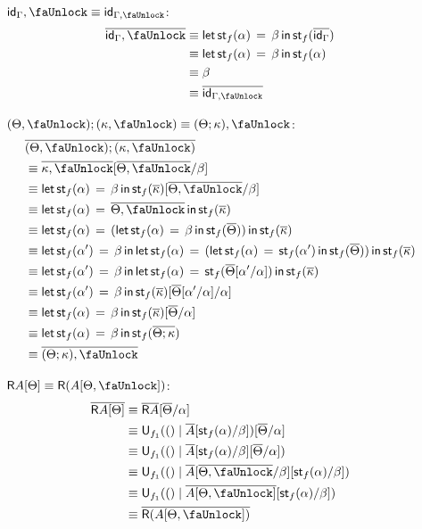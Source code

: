 \documentclass[10pt]{article}
\theoremstyle{definition}
\newcommand{\id}{\mathsf{id}}
\newcommand\U[3]{\ensuremath{\mathsf{U}_{#1}(#2 \mid #3)}}
\newcommand\StI[2]{\ensuremath{\mathsf{st}_{#1}(#2)}}
\newcommand\StE[4]{\ensuremath{\mathsf{let} \, \StI{#1}{#3} \, = \, {#2} \, \mathsf{in} \, #4}}
\newcommand{\upstairs}[1]{\overline{#1}}
\newcommand{\lock}{\text{\faUnlock}}
\newcommand{\Rtype}[1]{\mathsf{R}{#1}}
\begin{document}
\begin{enumerate}[style = multiline, labelwidth = 80pt]
\item[{$\id_\Gamma , \lock \equiv \id_{\Gamma, \lock}$}:]
\begin{align*}
\upstairs{\id_\Gamma , \lock} 
&\equiv \StE{f}{\beta}{\alpha}{\StI{f}{\upstairs{\id_\Gamma}}} \\ 
&\equiv \StE{f}{\beta}{\alpha}{\StI{f}{\alpha}} \\ 
&\equiv \beta \\
&\equiv \upstairs{\id_{\Gamma , \lock}} 
\end{align*}
\item[{$(\Theta, \lock) ; (\kappa, \lock) \equiv (\Theta ; \kappa), \lock$}:] 
\begin{align*}
&\upstairs{(\Theta, \lock) ; (\kappa, \lock)} \\
&\equiv \upstairs{\kappa, \lock}[\upstairs{\Theta, \lock}/\beta] \\
&\equiv \StE{f}{\beta}{\alpha}{\StI{f}{\upstairs{\kappa}}}[\upstairs{\Theta, \lock}/\beta] \\
&\equiv \StE{f}{\upstairs{\Theta, \lock}}{\alpha}{\StI{f}{\upstairs{\kappa}}} \\
&\equiv \StE{f}{(\StE{f}{\beta}{\alpha}{\StI{f}{\upstairs{\Theta}}})}{\alpha}{\StI{f}{\upstairs{\kappa}}} \\
&\equiv \StE{f}{\beta}{\alpha'}{\StE{f}{(\StE{f}{\StI{f}{\alpha'}}{\alpha}{\StI{f}{\upstairs{\Theta}}})}{\alpha}{\StI{f}{\upstairs{\kappa}}}} \\
&\equiv \StE{f}{\beta}{\alpha'}{\StE{f}{\StI{f}{\upstairs{\Theta}[\alpha'/\alpha]}}{\alpha}{\StI{f}{\upstairs{\kappa}}}} \\
&\equiv \StE{f}{\beta}{\alpha'}{\StI{f}{\upstairs{\kappa}}[\upstairs{\Theta}[\alpha'/\alpha]/\alpha]} \\
&\equiv \StE{f}{\beta}{\alpha}{\StI{f}{\upstairs{\kappa}}[\upstairs{\Theta}/\alpha]} \\
&\equiv \StE{f}{\beta}{\alpha}{\StI{f}{\upstairs{\Theta;\kappa}}} \\
&\equiv \upstairs{(\Theta;\kappa), \lock}
\end{align*}

\item[{$\Rtype{A}[\Theta] \equiv \Rtype{(A[\Theta, \lock])}$}:] 
\begin{align*}
\upstairs{\Rtype{A}[\Theta]}
&\equiv \upstairs{\Rtype{A}}[\upstairs{\Theta}/\alpha] \\
&\equiv \U{f_1}{()}{\upstairs{A}[\StI{f}{\alpha}/\beta]}[\upstairs{\Theta}/\alpha] \\
&\equiv \U{f_1}{()}{\upstairs{A}[\StI{f}{\alpha}/\beta][\upstairs{\Theta}/\alpha]} \\
&\equiv \U{f_1}{()}{\upstairs{A}[\upstairs{\Theta, \lock}/\beta][\StI{f}{\alpha}/\beta]} \\
&\equiv \U{f_1}{()}{\upstairs{A[\Theta, \lock]}[\StI{f}{\alpha}/\beta]} \\
&\equiv \upstairs{\Rtype{(A[\Theta, \lock])}} 
\end{align*}


\end{enumerate}
\end{document}
